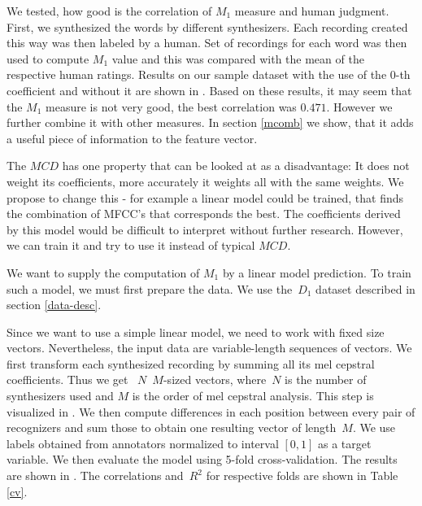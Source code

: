 \par
We tested, how good is the correlation of $M_1$ measure and human judgment. First, we synthesized the words by different synthesizers. Each recording created this way was then labeled by a human. Set of recordings for each word was then used to compute $M_1$ value and this was compared with the mean of the respective human ratings. Results on our sample dataset with the use of the $0$-th coefficient and without it are shown in . Based on these results, it may seem that the $M_1$ measure is not very good, the best correlation was $0.471$. However we further combine it with other measures.
In section \ref{mcomb} we show, that it adds a useful piece of information to the feature vector.
\par
{}
The $MCD$ has one property that can be looked at as a disadvantage: It does not weight its coefficients, more accurately it weights all with the same weights. We propose to change this - for example a linear model could be trained, that finds the combination of MFCC's that corresponds the best. The coefficients derived by this model would be difficult to interpret without further research. However, we can train it and try to use it instead of typical $MCD$.
\par
We want to supply the computation of $M_1$ by a linear model prediction. To train such a model, we must first prepare the data. We use the~$D_1$ dataset described in section \ref{data-desc}.
\par
Since we want to use a simple linear model, we need to work with fixed size vectors. Nevertheless, the input data are variable-length sequences of vectors. We first transform each synthesized recording by summing all its mel cepstral coefficients. Thus we get ~$N$~$M$-sized vectors, where~$N$ is the number of synthesizers used and $M$ is the order of mel cepstral analysis. This step is visualized in . We then compute differences in each position between every pair of recognizers and sum those to obtain one resulting vector of length~$M$. We use labels obtained from annotators normalized to interval $[0, 1]$ as a target variable. We then evaluate the model using 5-fold cross-validation. The results are shown in . The correlations and~$R^2$ for respective folds are shown in Table \ref{cv}.
